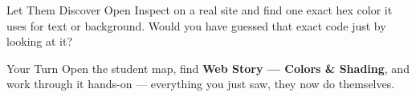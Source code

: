 \documentclass[aspectratio=169]{beamer}
\begin{document}
\begin{frame}{Let Them Discover}
    \Large
    Open Inspect on a real site and find one exact hex color it uses for text or background. Would you have guessed that exact code just by looking at it?
\end{frame}

\begin{frame}{Your Turn}
    \Large
    Open the student map, find \textbf{Web Story — Colors \& Shading}, and work through it
    hands-on --- everything you just saw, they now do themselves.
\end{frame}
\end{document}
